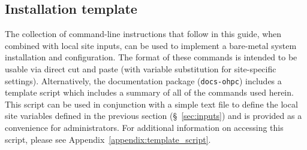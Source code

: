 \subsection{Installation template}
The collection of command-line instructions that follow in this guide, when
combined with local site inputs, can be used to implement a
bare-metal system installation and configuration. The format of these commands
is intended to be usable via direct cut and paste (with variable substitution
for site-specific settings). Alternatively, the \OHPC{} documentation package
(\texttt{docs-ohpc}) includes a template script which includes a summary of all
of the commands used herein. This script can be used in conjunction with a
simple text file to define the local site variables defined in the previous
section (\S~\ref{sec:inputs}) and is provided as a convenience for
administrators. For additional information on accessing this script, please see
Appendix~\ref{appendix:template_script}.

